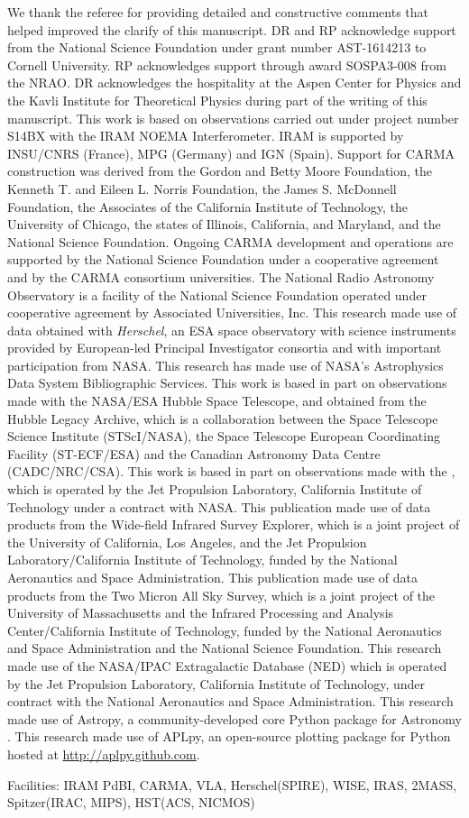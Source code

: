 \documentclass[]{emulateapj}
\begin{document}
\acknowledgments
We thank the referee for providing detailed and constructive comments that helped improved the clarify of this manuscript.
DR and RP acknowledge support from the National Science Foundation
under grant number AST-1614213 to Cornell University. RP acknowledges
support through award SOSPA3-008 from the NRAO. DR acknowledges the
hospitality at the Aspen Center for Physics and the Kavli Institute
for Theoretical Physics during part of the writing of this manuscript.
This work is based on observations carried out under project number S14BX
with the IRAM NOEMA Interferometer. IRAM is supported by INSU/CNRS (France), MPG (Germany) and IGN (Spain).
Support for CARMA construction was derived from the Gordon and Betty Moore
Foundation, the Kenneth T. and Eileen L. Norris Foundation, the James S.
McDonnell Foundation, the Associates of the California Institute of
Technology, the University of Chicago, the states of Illinois, California, and
Maryland, and the National Science Foundation. Ongoing CARMA development and
operations are supported by the National Science Foundation under a
cooperative agreement and by the CARMA consortium universities.
The National Radio Astronomy Observatory is a facility of the National Science
Foundation operated under cooperative agreement by Associated
Universities, Inc.
This research made use of data obtained with {\it Herschel}, an ESA space
observatory with science instruments provided by European-led Principal
Investigator consortia and with important participation from NASA.
This research has made use of NASA's Astrophysics Data System Bibliographic
Services.
This work is based in part on observations
made with the NASA/ESA Hubble Space Telescope, and obtained from the Hubble
Legacy Archive, which is a collaboration between the Space Telescope Science
Institute (STScI/NASA), the Space Telescope European Coordinating Facility
(ST-ECF/ESA) and the Canadian Astronomy Data Centre (CADC/NRC/CSA).
This work is based
in part on observations made with the \spitzer,
which is operated by the Jet Propulsion Laboratory, California Institute of
Technology under a contract with NASA.
This publication made use of data products from the Wide-field Infrared
Survey Explorer, which is a joint project of the University of California, Los
Angeles, and the Jet Propulsion Laboratory/California Institute of Technology,
funded by the National Aeronautics and Space Administration.
This publication made use of data products from the Two Micron All Sky
Survey, which is a joint project of the University of Massachusetts and the
Infrared Processing and Analysis Center/California Institute of Technology,
funded by the National Aeronautics and Space Administration and the National
Science Foundation.
This research made use of the NASA/IPAC Extragalactic Database (NED) which
is operated by the Jet Propulsion Laboratory, California Institute of
Technology, under contract with the National Aeronautics and Space
Administration.
This research made use of Astropy, a community-developed core Python package for Astronomy \citep{astropy}.
This research made use of APLpy, an open-source plotting package for Python hosted at \url{http://aplpy.github.com}.

Facilities: IRAM PdBI, CARMA, VLA, Herschel(SPIRE), WISE, IRAS, 2MASS, Spitzer(IRAC, MIPS), HST(ACS, NICMOS)






\end{document}
